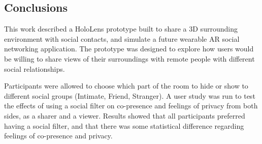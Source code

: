 
\subsection{Conclusions}

This work described a HoloLens prototype built to share a 3D surrounding environment with social contacts, and simulate a future wearable AR social networking application. The prototype was designed to explore how users would be willing to share views of their surroundings with remote people with different social relationships. 

Participants were allowed to choose which part of the room to hide or show to different social groups (Intimate, Friend, Stranger). A user study was run to test the effects of using a social filter on co-presence and feelings of privacy from both sides, as a sharer and a viewer. Results showed that all participants preferred having a social filter, and that there was some statistical difference regarding feelings of co-presence and privacy. 

